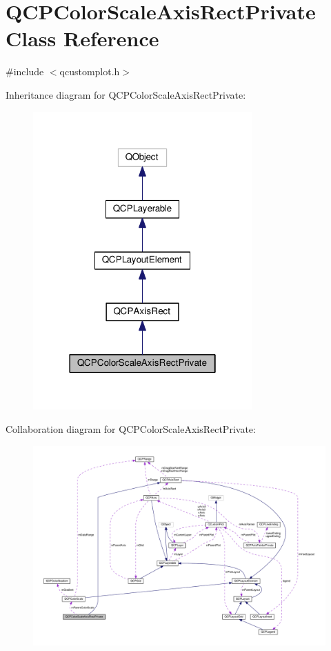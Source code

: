 \hypertarget{classQCPColorScaleAxisRectPrivate}{}\section{Q\+C\+P\+Color\+Scale\+Axis\+Rect\+Private Class Reference}
\label{classQCPColorScaleAxisRectPrivate}


{\ttfamily \#include $<$qcustomplot.\+h$>$}



Inheritance diagram for Q\+C\+P\+Color\+Scale\+Axis\+Rect\+Private\+:\nopagebreak
\begin{figure}[H]
\begin{center}
\leavevmode
\includegraphics[width=238pt]{classQCPColorScaleAxisRectPrivate__inherit__graph}
\end{center}
\end{figure}


Collaboration diagram for Q\+C\+P\+Color\+Scale\+Axis\+Rect\+Private\+:\nopagebreak
\begin{figure}[H]
\begin{center}
\leavevmode
\includegraphics[width=350pt]{classQCPColorScaleAxisRectPrivate__coll__graph}
\end{center}
\end{figure}
